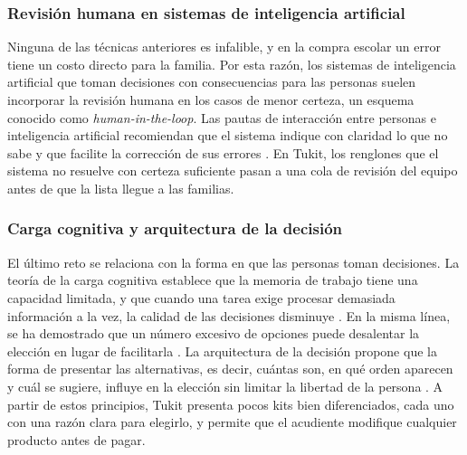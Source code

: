 \subsubsection{Revisión humana en sistemas de inteligencia artificial}

Ninguna de las técnicas anteriores es infalible, y en la compra escolar un error tiene un
costo directo para la familia. Por esta razón, los sistemas de inteligencia artificial que
toman decisiones con consecuencias para las personas suelen incorporar la revisión humana
en los casos de menor certeza, un esquema conocido como \emph{human-in-the-loop}. Las pautas
de interacción entre personas e inteligencia artificial recomiendan que el sistema indique
con claridad lo que no sabe y que facilite la corrección de sus errores
\citep{amershi_guidelines_2019}. En Tukit, los renglones que el sistema no resuelve con
certeza suficiente pasan a una cola de revisión del equipo antes de que la lista llegue a
las familias.\par

\subsubsection{Carga cognitiva y arquitectura de la decisión}

El último reto se relaciona con la forma en que las personas toman decisiones. La teoría de
la carga cognitiva establece que la memoria de trabajo tiene una capacidad limitada, y que
cuando una tarea exige procesar demasiada información a la vez, la calidad de las decisiones
disminuye \citep{sweller_cognitive_2011}. En la misma línea, se ha demostrado que un número
excesivo de opciones puede desalentar la elección en lugar de facilitarla
\citep{iyengar_when_2000}. La arquitectura de la decisión propone que la forma de presentar
las alternativas, es decir, cuántas son, en qué orden aparecen y cuál se sugiere, influye en
la elección sin limitar la libertad de la persona \citep{thaler_nudge_2008}. A partir de
estos principios, Tukit presenta pocos kits bien diferenciados, cada uno con una razón clara
para elegirlo, y permite que el acudiente modifique cualquier producto antes de pagar.\par
